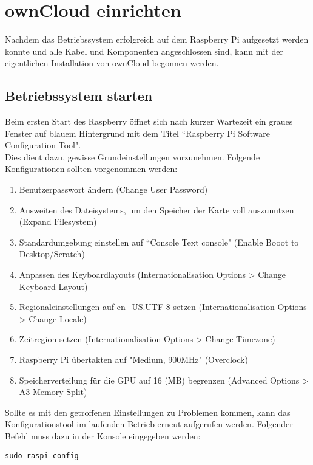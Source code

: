 \section{ownCloud einrichten}
Nachdem das Betriebssystem erfolgreich auf dem Raspberry Pi aufgesetzt werden konnte und alle Kabel und Komponenten angeschlossen sind, kann mit der eigentlichen Installation von ownCloud begonnen werden.

\subsection{Betriebssystem starten}
Beim ersten Start des Raspberry öffnet sich nach kurzer Wartezeit ein graues Fenster auf blauem Hintergrund mit dem Titel ``Raspberry Pi Software Configuration Tool". 
\\

Dies dient dazu, gewisse Grundeinstellungen vorzunehmen. Folgende Konfigurationen sollten vorgenommen werden: 

\begin{enumerate}
\item Benutzerpasswort ändern (Change User Password)
\item Ausweiten des Dateisystems, um den Speicher der Karte voll auszunutzen (Expand Filesystem)
\item Standardumgebung einstellen auf ``Console Text console" (Enable Booot to Desktop/Scratch)
\item Anpassen des Keyboardlayouts (Internationalisation Options > Change Keyboard Layout)
\item Regionaleinstellungen auf en\_US.UTF-8 setzen (Internationalisation Options > Change Locale)
\item Zeitregion setzen (Internationalisation Options > Change Timezone) 
\item Raspberry Pi übertakten auf "Medium, 900MHz" (Overclock)
\item Speicherverteilung für die GPU auf 16 (MB) begrenzen (Advanced Options > A3 Memory Split)
\end{enumerate}

Sollte es mit den getroffenen Einstellungen zu Problemen kommen, kann das Konfigurationstool im laufenden Betrieb erneut aufgerufen werden. Folgender Befehl muss dazu in der Konsole eingegeben werden: 
\\

\begin{lstlisting}
sudo raspi-config
\end{lstlisting} 

